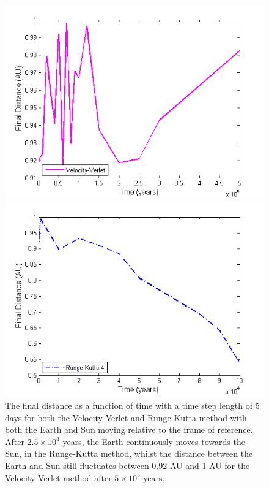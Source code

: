 \begin{figure}[H]
\centering
\begin{minipage}{.5\textwidth}
  \centering
  \includegraphics[width=1\linewidth]{Figures/test_distance_time_VV.png}
\end{minipage}%
\begin{minipage}{.5\textwidth}
  \centering
  \includegraphics[width=1\linewidth]{Figures/test_distance_time_RK4.png}
\end{minipage}
\caption{
The final distance as a function of time with a time step length of 5 days for both the Velocity-Verlet and Runge-Kutta method with both the Earth and Sun moving relative to the frame of reference.
After $2.5\times 10^4$ years, the Earth continuously moves towards the Sun, in the Runge-Kutta method, whilst the distance between the Earth and Sun still fluctuates between 0.92 AU and 1 AU for the Velocity-Verlet method after $5\times 10^5$ years.  
}
\label{fig:SunEarthMarsTest2}
\end{figure}
